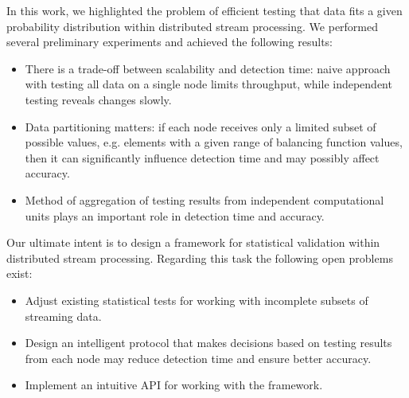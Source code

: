 \label {fs-short-conclusion}

In this work, we highlighted the problem of efficient testing that data fits a given probability distribution within distributed stream processing. We performed several preliminary experiments and achieved the following results:
\begin{itemize}
    \item There is a trade-off between scalability and detection time: naive approach with testing all data on a single node limits throughput, while independent testing reveals changes slowly.
    \item Data partitioning matters: if each node receives only a limited subset of possible values, e.g. elements with a given range of balancing function values, then it can significantly influence detection time and may possibly affect accuracy.
    \item Method of aggregation of testing results from independent computational units plays an important role in detection time and accuracy.
\end{itemize}

Our ultimate intent is to design a framework for statistical validation within distributed stream processing. Regarding this task the following open problems exist:

\begin{itemize}
    \item Adjust existing statistical tests for working with incomplete subsets of streaming data.
    \item Design an intelligent protocol that makes decisions based on testing results from each node may reduce detection time and ensure better accuracy.
    \item Implement an intuitive API for working with the framework.
\end{itemize}